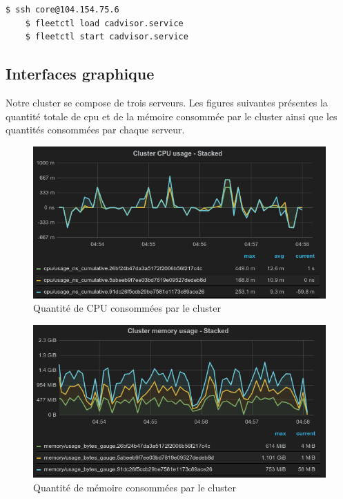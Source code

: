 \begin{onehalfspace}
\begin{lstlisting}[language=bash,caption=Lancement du service cAdvisor]
	$ ssh core@104.154.75.6 
	$ fleetctl load cadvisor.service
	$ fleetctl start cadvisor.service
\end{lstlisting}


\subsection{Interfaces graphique}

Notre cluster se compose de trois serveurs. Les figures suivantes présentes la quantité totale de \acrshort{cpu} et de la mémoire consommée par le cluster ainsi que les quantités consommées par chaque serveur.

\begin{figure}[H]
\centering
\includegraphics [scale=0.6]{chapitre5/assets/cluster-cpu}
\caption{Quantité de CPU consommées par le cluster}
\label{fig:}
\end{figure}

\begin{figure}[H]
\centering
\includegraphics [scale=0.6]{chapitre5/assets/cluster-memory}
\caption{Quantité de mémoire consommées par le cluster}
\label{fig:}
\end{figure}



\end{onehalfspace}
